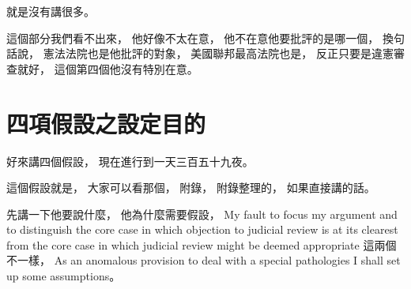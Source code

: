 \hypertarget{w06:cue:1212}{}就是沒有講很多。

\hypertarget{w06:cue:1213}{}這個部分我們看不出來，
\hypertarget{w06:cue:1214}{}他好像不太在意，
\hypertarget{w06:cue:1215}{}他不在意他要批評的是哪一個，
\hypertarget{w06:cue:1216}{}換句話說，
\hypertarget{w06:cue:1217}{}憲法法院也是他批評的對象，
\hypertarget{w06:cue:1218}{}美國聯邦最高法院也是，
\hypertarget{w06:cue:1219}{}反正只要是違憲審查就好，
\hypertarget{w06:cue:1220}{}這個第四個他沒有特別在意。

\section{四項假設之設定目的}

\hypertarget{w06:cue:1221}{}好來講四個假設，
\hypertarget{w06:cue:1222}{}現在進行到一天三百五十九夜。

\hypertarget{w06:cue:1223}{}這個假設就是，
\hypertarget{w06:cue:1224}{}大家可以看那個，
\hypertarget{w06:cue:1225}{}附錄，
\hypertarget{w06:cue:1226}{}附錄整理的，
\hypertarget{w06:cue:1227}{}如果直接講的話。

\hypertarget{w06:cue:1228}{}先講一下他要說什麼，
\hypertarget{w06:cue:1229}{}他為什麼需要假設，
\hypertarget{w06:cue:1230}{}My fault to focus my argument
\hypertarget{w06:cue:1231}{}and to distinguish the core case
\hypertarget{w06:cue:1232}{}in which objection to judicial review
\hypertarget{w06:cue:1233}{}is at its clearest
\hypertarget{w06:cue:1234}{}from the core case
\hypertarget{w06:cue:1235}{}in which judicial review
\hypertarget{w06:cue:1236}{}might be deemed appropriate
\hypertarget{w06:cue:1237}{}這兩個不一樣，
\hypertarget{w06:cue:1238}{}As an anomalous provision to deal with a special pathologies
\hypertarget{w06:cue:1239}{}I shall set up some assumptions。

